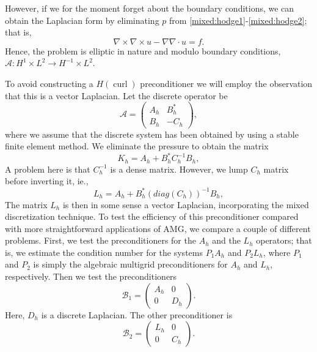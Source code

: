However, if we for the moment forget about the boundary conditions, 
we can obtain the Laplacian form  by eliminating $p$ 
from \eqref{mixed:hodge1}-\eqref{mixed:hodge2}; that is,    
\[
\nabla \times \nabla \times u - \nabla \nabla \cdot u = f .  
\]
Hence, the problem is elliptic
in nature and modulo boundary conditions,  $\mathcal{A}: H^1 \times L^2 \rightarrow  H^{-1} \times L^2$.

To avoid constructing a $H(\operatorname{curl})$ preconditioner we will employ
the observation that this is a vector Laplacian. 
Let the discrete operator be 
\[
\mathcal{A}  =
\begin{pmatrix} A_h & B_h^* \\ B_h & -C_h \end{pmatrix}, 
\]
where we assume that the discrete system has been obtained by using a stable finite
element method. We eliminate the pressure to obtain the matrix 
\[
K_h  = A_h +  B_h^* C^{-1}_h B_h, 
\]
A problem here is that $C^{-1}_h$ is a dense matrix. However, we lump $C_h$ matrix before inverting it, ie.,   
\[
L_h  = A_h +  B_h^* (diag(C_h))^{-1} B_h, 
\]
The matrix $L_h$ is then in some sense a vector Laplacian, incorporating the mixed discretization technique. 
To test the efficiency of this preconditioner compared with 
more straightforward applications of AMG, we compare a couple of different problems.   
First, we test the preconditioners for the $A_h$ and the $L_h$ operators; 
that is, we estimate the condition number for the systems 
$P_1 A_h$ and $P_2 L_h$, where $P_1$ and $P_2$ is simply the algebraic multigrid 
preconditioners for $A_h$ and $L_h$, respectively. 
Then we test the preconditioners 
\[
\mathcal{B}_1  =
\begin{pmatrix} A_h & 0  \\ 0  & D_h \end{pmatrix}. 
\]
Here, $D_h$ is a discrete Laplacian. The other preconditioner is   
\[
\mathcal{B}_2  =
\begin{pmatrix} L_h & 0  \\ 0  & C_h \end{pmatrix}. 
\]


